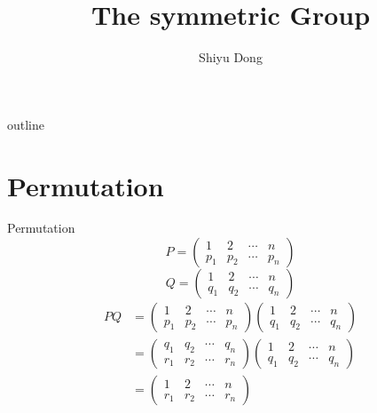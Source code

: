 \documentclass[11pt]{beamer}
\begin{document}
	\author{Shiyu Dong}
	\title{The symmetric Group}

	\begin{frame}[plain]
		\maketitle
	\end{frame}
\begin{frame}{outline}
	\tableofcontents
\end{frame}
		\section{Permutation}
	\begin{frame}{Permutation}
		\begin{equation}
			P=\begin{pmatrix}
				1&2&\cdots&n \\
				p_1&p_2&\cdots & p_n
			\end{pmatrix}
		\end{equation}
			\begin{equation}
		Q=\begin{pmatrix}
			1&2&\cdots&n \\
			q_1&q_2&\cdots & q_n
		\end{pmatrix}
	\end{equation}	
	\begin{align}
		PQ&=\begin{pmatrix}
			1&2&\cdots&n \\
			p_1&p_2&\cdots & p_n
		\end{pmatrix}\begin{pmatrix}
			1&2&\cdots&n \\
			q_1&q_2&\cdots & q_n
		\end{pmatrix} \\
		&=\begin{pmatrix}
				q_1&q_2&\cdots & q_n \\
			r_1&r_2&\cdots & r_n
		\end{pmatrix}\begin{pmatrix}
			1&2&\cdots&n \\
			q_1&q_2&\cdots & q_n
		\end{pmatrix} \\
		&=\begin{pmatrix}
			1&2&\cdots&n \\
			r_1&r_2&\cdots & r_n
		\end{pmatrix}
	\end{align}
		
	\end{frame}
\end{document}
